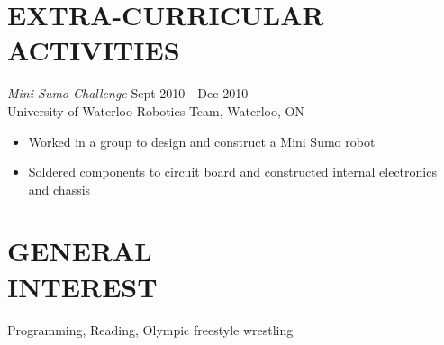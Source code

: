 \documentclass[margin]{res}
\begin{document}
\begin{resume}
\section{EXTRA-CURRICULAR \\ ACTIVITIES}                
{\it Mini Sumo Challenge}  \hfill Sept 2010 - Dec 2010\\
University of Waterloo Robotics Team, Waterloo, ON
\begin{itemize} \itemsep -2pt
  \item Worked in a group to design and construct a Mini Sumo robot 
  \item Soldered components to circuit board and constructed internal electronics and chassis
\end{itemize}

\section{GENERAL\\INTEREST}
  Programming, Reading, Olympic freestyle wrestling


\end{resume}
\end{document}
